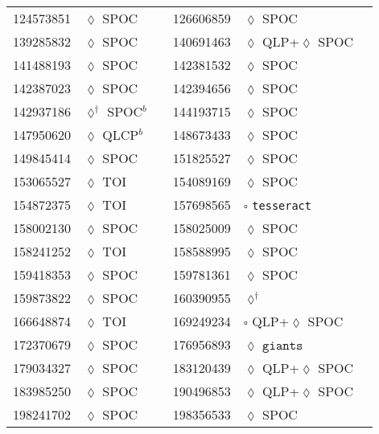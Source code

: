 \begin{longtable}{llrllr}
124573851 & $\lozenge$ SPOC & \cite{TIC_232540264} & 126606859 & $\lozenge$ SPOC & \cite{TIC_126606859} \\
139285832 & $\lozenge$ SPOC & \cite{TIC_139285832} & 140691463 & $\lozenge$ QLP+$\lozenge$ SPOC & \cite{TIC_140691463} \\
141488193 & $\lozenge$ SPOC & \cite{TIC_141488193} & 142381532 & $\lozenge$ SPOC & \cite{TIC_232540264} \\
142387023 & $\lozenge$ SPOC & \cite{TIC_232540264} & 142394656 & $\lozenge$ SPOC & \cite{TIC_142394656} \\
142937186 & $\lozenge^\dagger$ SPOC$^b$ & \cite{TIC_10837041} & 144193715 & $\lozenge$ SPOC & \cite{TIC_428699140} \\
147950620 & $\lozenge$ QLCP$^b$ & \cite{TIC_147950620} & 148673433 & $\lozenge$ SPOC & \cite{TIC_428699140} \\
149845414 & $\lozenge$ SPOC & \cite{TIC_219016883} & 151825527 & $\lozenge$ SPOC & \cite{TIC_428699140} \\
153065527 & $\lozenge$ TOI & \cite{TIC_154872375} & 154089169 & $\lozenge$ SPOC & \cite{TIC_232540264} \\
154872375 & $\lozenge$ TOI & \cite{TIC_154872375} & 157698565 & $\square$ \texttt{tesseract} & \cite{TIC_157698565} \\
158002130 & $\lozenge$ SPOC & \cite{TIC_232540264} & 158025009 & $\lozenge$ SPOC & \cite{TIC_158025009} \\
158241252 & $\lozenge$ TOI & \cite{TIC_154872375} & 158588995 & $\lozenge$ SPOC & \cite{TIC_158588995} \\
159418353 & $\lozenge$ SPOC & \cite{TIC_159418353} & 159781361 & $\lozenge$ SPOC & \cite{TIC_232540264} \\
159873822 & $\lozenge$ SPOC & \cite{TIC_159873822} & 160390955 & $\lozenge^\dagger$ & \cite{TIC_160390955} \\
166648874 & $\lozenge$ TOI & \cite{TIC_154872375} & 169249234 & $\square$ QLP+$\lozenge$ SPOC & \cite{TIC_332558858} \\
172370679 & $\lozenge$ SPOC & \cite{TIC_172370679} & 176956893 & $\lozenge$ $\texttt{giants}$ & \cite{TIC_176956893} \\
179034327 & $\lozenge$ SPOC & \cite{TIC_70513361} & 183120439 & $\lozenge$ QLP+$\lozenge$ SPOC & \cite{TIC_140691463} \\
183985250 & $\lozenge$ SPOC & \cite{TIC_183985250} & 190496853 & $\lozenge$ QLP+$\lozenge$ SPOC & \cite{TIC_83092282} \\
198241702 & $\lozenge$ SPOC & \cite{TIC_232540264} & 198356533 &  $\lozenge$ SPOC & \cite{TIC_198356533} \\

\end{longtable}
